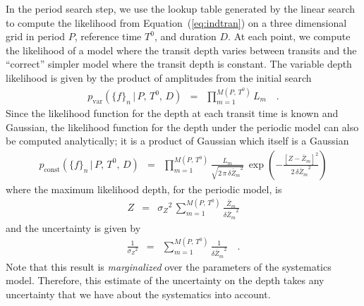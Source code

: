 \documentclass[12pt,preprint]{aastex}
\newcommand{\Eq}[1]{Equation~(\ref{eq:#1})}
\newcommand{\eq}[1]{\Eq{#1}}
\newcommand{\eqlabel}[1]{\label{eq:#1}}
\newcommand{\flux}{{\ensuremath{f}}}
\newcommand{\period}{{\ensuremath{P}}}
\newcommand{\phase}{{\ensuremath{T^0}}}
\newcommand{\duration}{{\ensuremath{D}}}
\newcommand{\depth}{{\ensuremath{Z}}}
\begin{document}
In the period search step, we use the lookup table generated by the linear
search to compute the likelihood from \eq{indtran} on a three dimensional
grid in period \period, reference time \phase, and duration \duration.
At each point, we compute the likelihood of a model where the transit depth
varies between transits and the ``correct'' simpler model where the transit
depth is constant.
The variable depth likelihood is given by the product of amplitudes from the
initial search
\begin{eqnarray}
p_\mathrm{var}(\{\flux\}_n\,|\,\period,\,\phase,\,\duration) &=&
\prod_{m=1}^{M(\period,\,\phase)} L_m \quad.
\end{eqnarray}
Since the likelihood function for the depth at each transit time is known and
Gaussian, the likelihood function for the depth under the periodic model can
also be computed analytically; it is a product of Gaussian which itself is a
Gaussian
\begin{eqnarray}
p_\mathrm{const}(\{\flux\}_n\,|\,\period,\,\phase,\,\duration) &=&
\prod_{m=1}^{M(\period,\,\phase)}
    \frac{L_m}{\sqrt{2\,\pi\,{\delta\bar{\depth}_m}^2}}\,\exp \left(
        -\frac{[\depth - \bar{\depth}_m]^2}{2\,{\delta\bar{\depth}_m}^2}
    \right)
\end{eqnarray}
where the maximum likelihood depth, for the periodic model, is
\begin{eqnarray}\eqlabel{periodic-depth}
\depth &=& {\sigma_\depth}^2\,\sum_{m=1}^{M(\period,\,\phase)}
    \frac{\bar{\depth}_m}{{\delta\bar{\depth}_m}^2}
\end{eqnarray}
and the uncertainty is given by
\begin{eqnarray}\eqlabel{periodic-depth-uncert}
\frac{1}{{\sigma_\depth}^2} &=& \sum_{m=1}^{M(\period,\,\phase)}
    \frac{1}{{\delta\bar{\depth}_m}^2} \quad.
\end{eqnarray}
Note that this result is \emph{marginalized} over the parameters of the
systematics model.
Therefore, this estimate of the uncertainty on the depth takes any
uncertainty that we have about the systematics into account.
\end{document}
